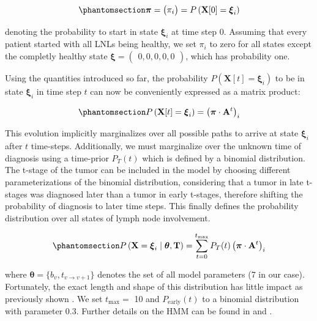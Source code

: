 \documentclass[
  sn-mathphys-num,
]{sn-jnl}
\begin{document}
\begin{equation}\phantomsection\label{eq-starting-distribution}{
\boldsymbol{\pi} = \begin{pmatrix} \pi_i \end{pmatrix} = P \left( \mathbf{X}[0] = \boldsymbol{\xi}_i \right)
}\end{equation}

denoting the probability to start in state \(\boldsymbol{\xi}_i\) at
time step 0. Assuming that every patient started with all LNLs being
healthy, we set \(\pi_i\) to zero for all states except the completly
healthy state
\(\boldsymbol{\xi} = \begin{pmatrix} 0, 0, 0, 0, 0 \end{pmatrix}\),
which has probability one.

Using the quantities introduced so far, the probability
\(P \left( \mathbf{X}[t]=\boldsymbol{\xi}_i \right)\) to be in state
\(\boldsymbol{\xi}_i\) in time step \(t\) can now be conveniently
expressed as a matrix product:

\begin{equation}\phantomsection\label{eq-evolution}{
P \left( \mathbf{X}[t]=\boldsymbol{\xi}_i \right) = \left( \boldsymbol{\pi} \cdot \mathbf{A}^t \right)_i
}\end{equation}

This evolution implicitly marginalizes over all possible paths to arrive
at state \(\boldsymbol{\xi}_i\) after \(t\) time-steps. Additionally, we
must marginalize over the unknown time of diagnosis using a time-prior
\(P_T(t)\) which is defined by a binomial distribution. The t-stage of
the tumor can be included in the model by choosing different
parameterizations of the binomial distribution, considering that a tumor
in late t-stages was diagnosed later than a tumor in early t-stages,
therefore shifting the probability of diagnosis to later time steps.
This finally defines the probability distribution over all states of
lymph node involvement.

\begin{equation}\phantomsection\label{eq-marginalized-evolution}{
P \left( \mathbf{X}=\boldsymbol{\xi}_i \mid \boldsymbol{\theta}, \mathbf{T} \right) = \sum_{t=0}^{t_\text{max}} P_T(t) \left( \boldsymbol{\pi} \cdot \mathbf{A}^t \right)_i
}\end{equation}

where \(\boldsymbol{\theta}=\{ b_v, t_{v \rightarrow v+1} \}\) denotes
the set of all model parameters (7 in our case). Fortunately, the exact
length and shape of this distribution has little impact as previously
shown \citep{ludwig_hidden_2021}. We set \(t_\text{max}=\) 10 and
\(P_\text{early}(t)\) to a binomial distribution with parameter 0.3.
Further details on the HMM can be found in \citet{ludwig_hidden_2021}
and \citet{zora231470}.
\end{document}
